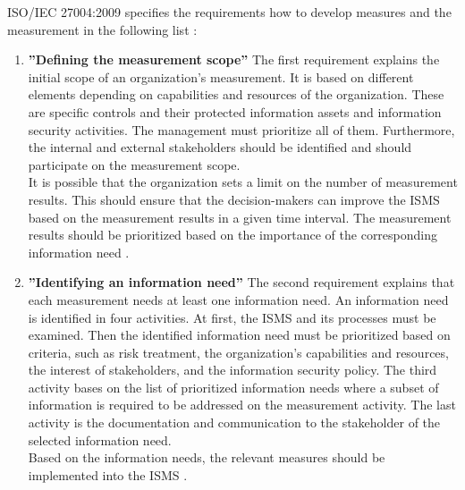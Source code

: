 ISO/IEC 27004:2009 specifies the requirements how to develop measures and the measurement in the following list \cite{ISO_27004_2009}:

\begin{enumerate}[label=(\alph*)]
  \item \label{itm:a} \textbf{''Defining the measurement scope''}
  The first requirement explains the initial scope of an organization's measurement. It is based on different elements depending on capabilities and resources of the organization. These are specific controls and their protected information assets and information security activities. The management must prioritize all of them. Furthermore, the internal and external stakeholders should be identified and should participate on the measurement scope. \\
  It is possible that the organization sets a limit on the number of measurement results. This should ensure that the decision-makers can improve the ISMS based on the measurement results in a given time interval. The measurement results should be prioritized based on the importance of the corresponding information need \cite{ISO_27004_2009}. \\

  \item \label{itm:b} \textbf{''Identifying an information need''}
  The second requirement explains that each measurement needs at least one information need. An information need is identified in four activities. At first, the ISMS and its processes must be examined. Then the identified information need must be prioritized based on criteria, such as risk treatment, the organization's capabilities and resources, the interest of stakeholders, and the information security policy. The third activity bases on the list of prioritized information needs where a subset of information is required to be addressed on the measurement activity. The last activity is the documentation and communication to the stakeholder of the selected information need. \\
  Based on the information needs, the relevant measures should be implemented into the ISMS \cite{ISO_27004_2009}. \\


\end{enumerate}
